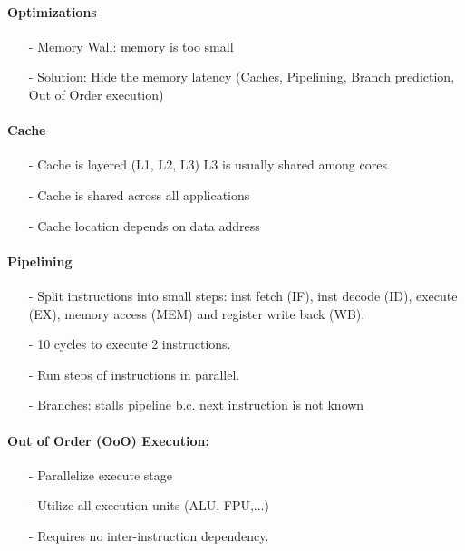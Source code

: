 \paragraph{Optimizations} 
\begin{itemize}
    \item[-]Memory Wall: memory is too small
    \item[-]Solution: Hide the memory latency (Caches, Pipelining, Branch prediction, Out of Order execution)
\end{itemize}{}

\paragraph{Cache}
\begin{itemize}
    \item[-]Cache is layered (L1, L2, L3) L3 is usually shared among cores.
    \item[-]Cache is shared across all applications
    \item[-]Cache location depends on data address
\end{itemize}{}

\paragraph{Pipelining}
\begin{itemize}
    \item[-]Split instructions into small steps: inst fetch (IF), inst decode (ID), execute (EX), memory access (MEM) and register write back (WB).
    \item[-]10 cycles to execute 2 instructions.
    \item[-]Run steps of instructions in parallel.
    \item[-]Branches: stalls pipeline b.c. next instruction is not known
\end{itemize}{}
\paragraph{Out of Order (OoO) Execution: }
\begin{itemize}
    \item[-]Parallelize execute stage
    \item[-]Utilize all execution units (ALU, FPU,...)
    \item[-]Requires no inter-instruction dependency.
\end{itemize}{}

